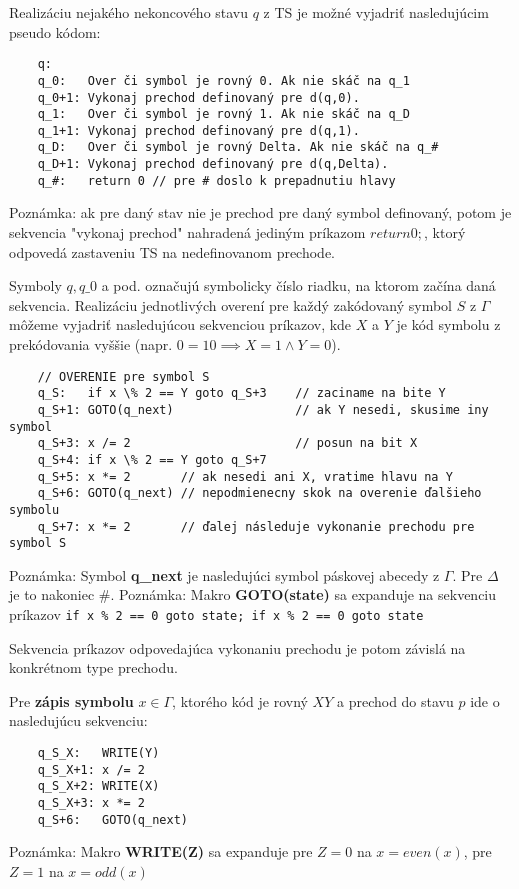 \documentclass[10pt]{article}
\begin{document}
    Realizáciu nejakého nekoncového stavu $q$ z TS je možné vyjadriť nasledujúcim pseudo kódom:
    \begin{verbatim}
    q: 
    q_0:   Over či symbol je rovný 0. Ak nie skáč na q_1
    q_0+1: Vykonaj prechod definovaný pre d(q,0). 
    q_1:   Over či symbol je rovný 1. Ak nie skáč na q_D
    q_1+1: Vykonaj prechod definovaný pre d(q,1). 
    q_D:   Over či symbol je rovný Delta. Ak nie skáč na q_#
    q_D+1: Vykonaj prechod definovaný pre d(q,Delta). 
    q_#:   return 0 // pre # doslo k prepadnutiu hlavy
    \end{verbatim}

    Poznámka: ak pre daný stav nie je prechod pre daný symbol definovaný, potom je sekvencia
    "vykonaj prechod" nahradená jediným príkazom $return 0;$, ktorý odpovedá zastaveniu TS na
    nedefinovanom prechode.

    Symboly $q, q\_0$ a pod. označujú symbolicky číslo riadku, na ktorom začína daná sekvencia. 
    Realizáciu jednotlivých overení pre každý zakódovaný symbol $S$ z $\Gamma$ môžeme vyjadriť
    nasledujúcou sekvenciou príkazov, kde $X$ a $Y$ je kód symbolu z prekódovania vyššie (napr. $0 =
    10 \implies X = 1 \land Y = 0$).
    \begin{verbatim}
    // OVERENIE pre symbol S 
    q_S:   if x \% 2 == Y goto q_S+3    // zaciname na bite Y
    q_S+1: GOTO(q_next)                 // ak Y nesedi, skusime iny symbol 
    q_S+3: x /= 2                       // posun na bit X
    q_S+4: if x \% 2 == Y goto q_S+7 
    q_S+5: x *= 2       // ak nesedi ani X, vratime hlavu na Y
    q_S+6: GOTO(q_next) // nepodmienecny skok na overenie ďalšieho symbolu
    q_S+7: x *= 2       // ďalej následuje vykonanie prechodu pre symbol S
    \end{verbatim}
    Poznámka: Symbol \textbf{q\_next} je nasledujúci symbol páskovej abecedy z $\Gamma$. Pre
    $\Delta$ je to nakoniec $\#$.  
    Poznámka: Makro \textbf{GOTO(state)} sa expanduje na sekvenciu príkazov \texttt{if x \% 2 == 0 goto
    state; if x \% 2 == 0 goto state} 

    Sekvencia príkazov odpovedajúca vykonaniu prechodu je potom závislá na konkrétnom type prechodu.
    
    Pre \textbf{zápis symbolu} $x \in \Gamma$, ktorého kód je rovný $XY$ a prechod do stavu $p$ ide o
    nasledujúcu sekvenciu:
    \begin{verbatim}
    q_S_X:   WRITE(Y)
    q_S_X+1: x /= 2
    q_S_X+2: WRITE(X)
    q_S_X+3: x *= 2
    q_S+6:   GOTO(q_next)
    \end{verbatim}
    Poznámka: Makro \textbf{WRITE(Z)} sa expanduje pre $Z = 0$ na $x = even(x)$, pre $Z = 1$ na $x = odd(x)$ 
\end{document}
